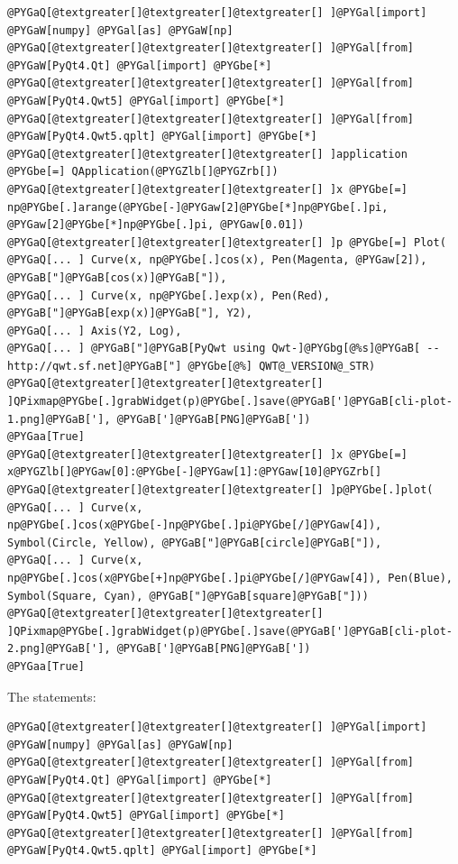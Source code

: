 \documentclass[a4paper,10pt,english]{manual}
\begin{document}
\begin{Verbatim}[commandchars=@\[\]]
@PYGaQ[@textgreater[]@textgreater[]@textgreater[] ]@PYGal[import] @PYGaW[numpy] @PYGal[as] @PYGaW[np]
@PYGaQ[@textgreater[]@textgreater[]@textgreater[] ]@PYGal[from] @PYGaW[PyQt4.Qt] @PYGal[import] @PYGbe[*]
@PYGaQ[@textgreater[]@textgreater[]@textgreater[] ]@PYGal[from] @PYGaW[PyQt4.Qwt5] @PYGal[import] @PYGbe[*]
@PYGaQ[@textgreater[]@textgreater[]@textgreater[] ]@PYGal[from] @PYGaW[PyQt4.Qwt5.qplt] @PYGal[import] @PYGbe[*]
@PYGaQ[@textgreater[]@textgreater[]@textgreater[] ]application @PYGbe[=] QApplication(@PYGZlb[]@PYGZrb[])
@PYGaQ[@textgreater[]@textgreater[]@textgreater[] ]x @PYGbe[=] np@PYGbe[.]arange(@PYGbe[-]@PYGaw[2]@PYGbe[*]np@PYGbe[.]pi, @PYGaw[2]@PYGbe[*]np@PYGbe[.]pi, @PYGaw[0.01])
@PYGaQ[@textgreater[]@textgreater[]@textgreater[] ]p @PYGbe[=] Plot(
@PYGaQ[... ] Curve(x, np@PYGbe[.]cos(x), Pen(Magenta, @PYGaw[2]), @PYGaB["]@PYGaB[cos(x)]@PYGaB["]),
@PYGaQ[... ] Curve(x, np@PYGbe[.]exp(x), Pen(Red), @PYGaB["]@PYGaB[exp(x)]@PYGaB["], Y2),
@PYGaQ[... ] Axis(Y2, Log),
@PYGaQ[... ] @PYGaB["]@PYGaB[PyQwt using Qwt-]@PYGbg[@%s]@PYGaB[ -- http://qwt.sf.net]@PYGaB["] @PYGbe[@%] QWT@_VERSION@_STR)
@PYGaQ[@textgreater[]@textgreater[]@textgreater[] ]QPixmap@PYGbe[.]grabWidget(p)@PYGbe[.]save(@PYGaB[']@PYGaB[cli-plot-1.png]@PYGaB['], @PYGaB[']@PYGaB[PNG]@PYGaB['])
@PYGaa[True]
@PYGaQ[@textgreater[]@textgreater[]@textgreater[] ]x @PYGbe[=] x@PYGZlb[]@PYGaw[0]:@PYGbe[-]@PYGaw[1]:@PYGaw[10]@PYGZrb[]
@PYGaQ[@textgreater[]@textgreater[]@textgreater[] ]p@PYGbe[.]plot(
@PYGaQ[... ] Curve(x, np@PYGbe[.]cos(x@PYGbe[-]np@PYGbe[.]pi@PYGbe[/]@PYGaw[4]), Symbol(Circle, Yellow), @PYGaB["]@PYGaB[circle]@PYGaB["]),
@PYGaQ[... ] Curve(x, np@PYGbe[.]cos(x@PYGbe[+]np@PYGbe[.]pi@PYGbe[/]@PYGaw[4]), Pen(Blue), Symbol(Square, Cyan), @PYGaB["]@PYGaB[square]@PYGaB["]))
@PYGaQ[@textgreater[]@textgreater[]@textgreater[] ]QPixmap@PYGbe[.]grabWidget(p)@PYGbe[.]save(@PYGaB[']@PYGaB[cli-plot-2.png]@PYGaB['], @PYGaB[']@PYGaB[PNG]@PYGaB['])
@PYGaa[True]
\end{Verbatim}

The statements:

\begin{Verbatim}[commandchars=@\[\]]
@PYGaQ[@textgreater[]@textgreater[]@textgreater[] ]@PYGal[import] @PYGaW[numpy] @PYGal[as] @PYGaW[np]
@PYGaQ[@textgreater[]@textgreater[]@textgreater[] ]@PYGal[from] @PYGaW[PyQt4.Qt] @PYGal[import] @PYGbe[*]
@PYGaQ[@textgreater[]@textgreater[]@textgreater[] ]@PYGal[from] @PYGaW[PyQt4.Qwt5] @PYGal[import] @PYGbe[*]
@PYGaQ[@textgreater[]@textgreater[]@textgreater[] ]@PYGal[from] @PYGaW[PyQt4.Qwt5.qplt] @PYGal[import] @PYGbe[*]
\end{Verbatim}
\end{document}
